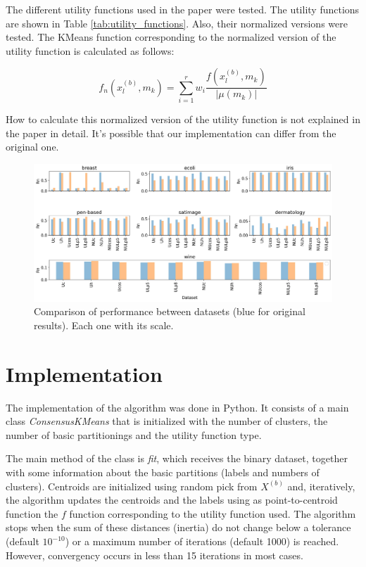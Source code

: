 \documentclass[twocolumn]{article}
\begin{document}
The different utility functions used in the paper were tested. The utility functions are shown in 
Table \ref{tab:utility_functions}. Also, their normalized versions were tested. The KMeans function
corresponding to the normalized version of the utility function is calculated as follows:

\begin{equation}
  f_n(x_l^{(b)}, m_k) = \sum_{i=1}^r w_i \frac{f(x_l^{(b)}, m_k)}{|\mu(m_k)|}
\end{equation}

How to calculate this normalized version of the utility function is not explained in the paper in detail.
It's possible that our implementation can differ from the original one.
  
\begin{figure}[h!]
  \centering
  \includegraphics[width=\textwidth]{img/results_comparison_dataset.jpg}
  \caption{Comparison of performance between datasets (blue for original results). Each one with its scale.}
  \label{fig:ari-datasets}
\end{figure}

\section{Implementation}

The implementation of the algorithm was done in Python. It consists of a main class \textit{ConsensusKMeans} 
that is initialized with the number of clusters, the number of basic partitionings and the utility function type.

The main method of the class is \textit{fit}, which receives the binary dataset, together with some information about the 
basic partitions (labels and numbers of clusters). Centroids are initialized using random pick from $X^{(b)}$ and, iteratively, 
the algorithm updates the centroids and the labels using as point-to-centroid function the $f$ function corresponding to the utility
function used. The algorithm stops when the sum of these distances (inertia) do not change below a tolerance (default $10^{-10}$) or a
maximum number of iterations (default 1000) is reached. However, convergency occurs in less than 15 iterations in most cases.
\end{document}
